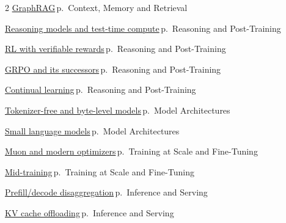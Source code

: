 \documentclass[10pt,a4paper,openany]{report}
\begin{document}
\begin{multicols}{2}
\hyperref[c:context-7]{GraphRAG}\,{\color{muted}\scriptsize p.\,\pageref{c:context-7}} {\color{muted}\scriptsize Context, Memory and Retrieval}\par\vspace{2pt}
\hyperref[c:reasoning-0]{Reasoning models and test-time compute}\,{\color{muted}\scriptsize p.\,\pageref{c:reasoning-0}} {\color{muted}\scriptsize Reasoning and Post-Training}\par\vspace{2pt}
\hyperref[c:reasoning-2]{RL with verifiable rewards}\,{\color{muted}\scriptsize p.\,\pageref{c:reasoning-2}} {\color{muted}\scriptsize Reasoning and Post-Training}\par\vspace{2pt}
\hyperref[c:reasoning-4]{GRPO and its successors}\,{\color{muted}\scriptsize p.\,\pageref{c:reasoning-4}} {\color{muted}\scriptsize Reasoning and Post-Training}\par\vspace{2pt}
\hyperref[c:reasoning-11]{Continual learning}\,{\color{muted}\scriptsize p.\,\pageref{c:reasoning-11}} {\color{muted}\scriptsize Reasoning and Post-Training}\par\vspace{2pt}
\hyperref[c:arch-9]{Tokenizer-free and byte-level models}\,{\color{muted}\scriptsize p.\,\pageref{c:arch-9}} {\color{muted}\scriptsize Model Architectures}\par\vspace{2pt}
\hyperref[c:arch-11]{Small language models}\,{\color{muted}\scriptsize p.\,\pageref{c:arch-11}} {\color{muted}\scriptsize Model Architectures}\par\vspace{2pt}
\hyperref[c:training-2]{Muon and modern optimizers}\,{\color{muted}\scriptsize p.\,\pageref{c:training-2}} {\color{muted}\scriptsize Training at Scale and Fine-Tuning}\par\vspace{2pt}
\hyperref[c:training-4]{Mid-training}\,{\color{muted}\scriptsize p.\,\pageref{c:training-4}} {\color{muted}\scriptsize Training at Scale and Fine-Tuning}\par\vspace{2pt}
\hyperref[c:inference-3]{Prefill/decode disaggregation}\,{\color{muted}\scriptsize p.\,\pageref{c:inference-3}} {\color{muted}\scriptsize Inference and Serving}\par\vspace{2pt}
\hyperref[c:inference-4]{KV cache offloading}\,{\color{muted}\scriptsize p.\,\pageref{c:inference-4}} {\color{muted}\scriptsize Inference and Serving}\par\vspace{2pt}

\end{multicols}
\end{document}
